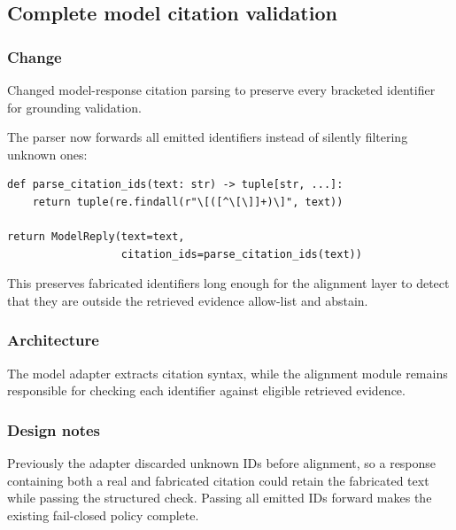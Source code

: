 
\subsection{Complete model citation validation}


\subsubsection{Change}

Changed model-response citation parsing to preserve every bracketed identifier for grounding validation.

The parser now forwards all emitted identifiers instead of silently filtering unknown ones:

\begin{verbatim}
def parse_citation_ids(text: str) -> tuple[str, ...]:
    return tuple(re.findall(r"\[([^\[\]]+)\]", text))

return ModelReply(text=text,
                  citation_ids=parse_citation_ids(text))
\end{verbatim}

This preserves fabricated identifiers long enough for the alignment layer to detect that they are outside the retrieved evidence allow-list and abstain.

\subsubsection{Architecture}

The model adapter extracts citation syntax, while the alignment module remains responsible for checking each identifier against eligible retrieved evidence.

\subsubsection{Design notes}

Previously the adapter discarded unknown IDs before alignment, so a response containing both a real and fabricated citation could retain the fabricated text while passing the structured check. Passing all emitted IDs forward makes the existing fail-closed policy complete.

